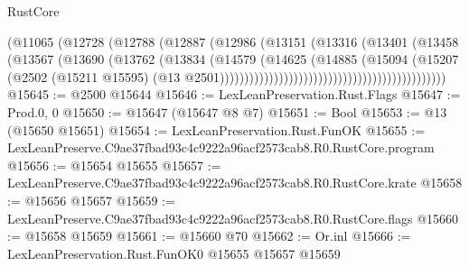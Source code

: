 \begin{lexlean}{RustCore}
\begin{coremodule}
                                                        (@11065
                                                          (@12728
                                                            (@12788
                                                              (@12887
                                                                (@12986
                                                                  (@13151
                                                                    (@13316
                                                                      (@13401
                                                                        (@13458
                                                                          (@13567
                                                                            (@13690
                                                                              (@13762
                                                                                (@13834
                                                                                  (@14579
                                                                                    (@14625
                                                                                      (@14885
                                                                                        (@15094
                                                                                          (@15207
                                                                                            (@2502
                                                                                              (@15211
                                                                                                @15595)
                                                                                              (@13
                                                                                                @2501))))))))))))))))))))))))))))))))))))))))))))))
@15645 := @2500 @15644
@15646 := LexLeanPreservation.Rust.Flags
@15647 := Prod.{0, 0}
@15650 := @15647 (@15647 @8 @7)
@15651 := Bool
@15653 := @13 (@15650 @15651)
@15654 := LexLeanPreservation.Rust.FunOK
@15655 := LexLeanPreserve.C9ae37fbad93c4c9222a96acf2573cab8.R0.RustCore.program
@15656 := @15654 @15655
@15657 := LexLeanPreserve.C9ae37fbad93c4c9222a96acf2573cab8.R0.RustCore.krate
@15658 := @15656 @15657
@15659 := LexLeanPreserve.C9ae37fbad93c4c9222a96acf2573cab8.R0.RustCore.flags
@15660 := @15658 @15659
@15661 := @15660 @70
@15662 := Or.inl
@15666 := LexLeanPreservation.Rust.FunOK0 @15655 @15657 @15659

\end{coremodule}
\end{lexlean}
